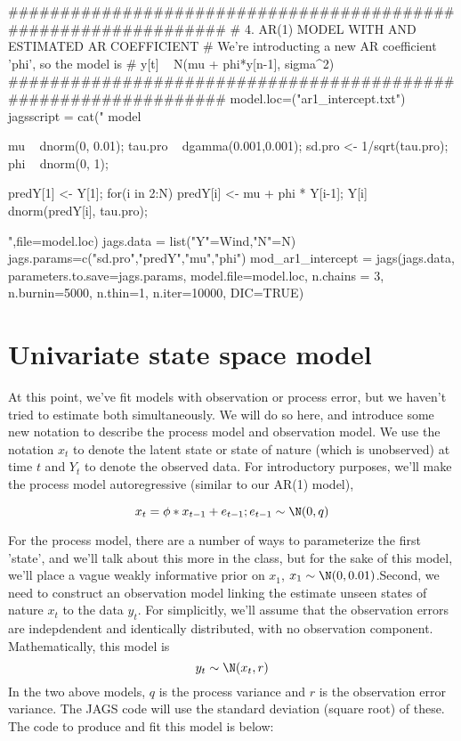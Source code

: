 \begin{Schunk}
\begin{Sinput}
 ################################################################
 # 4. AR(1) MODEL WITH AND ESTIMATED AR COEFFICIENT
 # We're introducting a new AR coefficient 'phi', so the model is 
 # y[t] ~ N(mu + phi*y[n-1], sigma^2) 
 ################################################################
 model.loc=("ar1_intercept.txt")
 jagsscript = cat("
 model {  
    mu ~ dnorm(0, 0.01); 
    tau.pro ~ dgamma(0.001,0.001); 
    sd.pro <- 1/sqrt(tau.pro); 
    phi ~ dnorm(0, 1); 
    
    predY[1] <- Y[1];
    for(i in 2:N) {
       predY[i] <- mu + phi * Y[i-1]; 
       Y[i] ~ dnorm(predY[i], tau.pro);
    }
 }  
 ",file=model.loc)
 jags.data = list("Y"=Wind,"N"=N)
 jags.params=c("sd.pro","predY","mu","phi")
 mod_ar1_intercept = jags(jags.data, parameters.to.save=jags.params, 
         model.file=model.loc, n.chains = 3, n.burnin=5000, n.thin=1, 
         n.iter=10000, DIC=TRUE)  
\end{Sinput}
\end{Schunk}


\section{Univariate state space model}\label{sec:uss}

At this point, we've fit models with observation or process error, but we haven't tried to estimate both simultaneously. We will do so here, and introduce some new notation to describe the process model and observation model. We use the notation ${x_t}$ to denote the latent state or state of nature (which is unobserved) at time $t$ and ${Y_t}$ to denote the observed data. For introductory purposes, we'll make the process model autoregressive (similar to our AR(1) model),

\begin{equation}
x_{t} = \phi * x_{t-1} + e_{t-1}; e_{t-1} \sim \N(0,q)
\end{equation}

For the process model, there are a number of ways to parameterize the first 'state', and we'll talk about this more in the class, but for the sake of this model, we'll place a vague weakly informative prior on $x_1$, $x_1 \sim \N(0, 0.01)$.Second, we need to construct an observation model linking the estimate unseen states of nature $x_t$ to the data $y_t$. For simplicitly, we'll assume that the observation errors are indepdendent and identically distributed, with no observation component. Mathematically, this model is 
\begin{equation}
y_t \sim \N(x_t, r)
\end{equation}
In the two above models, $q$ is the  process variance and $r$ is the observation error variance. The JAGS code will use the standard deviation (square root) of these.  The code to produce and fit this model is below:

